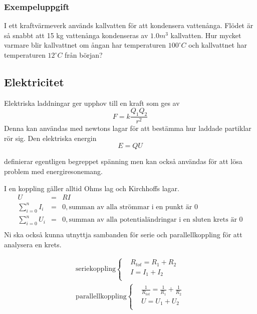 \documentclass[10pt, titlepage, oneside, a4paper]{article}
\newcommand{\Subsection}[1]{\vspace{-4pt}\subsection{#1}\vspace{-8pt}}
\begin{document}
    \subsubsection{Exempeluppgift}
    I ett kraftvärmeverk används kallvatten för att kondensera vattenånga. Flödet är så snabbt att 15 kg vattenånga
    kondenseras av $1.0 m^3$ kallvatten. Hur mycket varmare blir kallvattnet om ångan har temperaturen $100 ^{\circ} C$ och
    kallvattnet har temperaturen $12 ^{\circ}C$ från början?
    \newpage
    \Subsection{Elektricitet}
    Elektriska laddningar ger upphov till en kraft som ges av
    \begin{equation}
        F = k \frac{Q_1 Q_2} {r^2}
    \end{equation}
    Denna kan användas med newtons lagar för att bestämma hur laddade partiklar rör sig. Den elektriska
    energin
    \begin{equation}
        \label{elektriskenergi}
        E = Q U
    \end{equation}

    definierar egentligen begreppet spänning men kan också användas för att lösa problem med energiresonemang.

    I en koppling gäller alltid Ohms lag och Kirchhoffs lagar.
    \begin{eqnarray}
        U &=& R I \\
        \sum_{i=0}^{n} I_i &=& 0, \text{summan av alla strömmar i en punkt är 0} \\
        \sum_{i=0}^{n} U_i &=& 0, \text{summan av alla potentialändringar i en sluten krets är 0} \\
    \end{eqnarray}
    Ni ska också kunna utnyttja sambanden för serie och parallellkoppling
    för att analysera en krets.

    \begin{eqnarray}
        \text{seriekoppling}
        \begin{cases}
            & R_{tot} = R_1 + R_2\\
            & I = I_1+I_2\\
        \end{cases} \\
        \text{parallellkoppling}
        \begin{cases}
             & \frac{1}{R_{tot}} = \frac{1}{R_1} + \frac{1}{R_2}\\
             & U = U_1+U_2\\
        \end{cases}
    \end{eqnarray}
\end{document}
